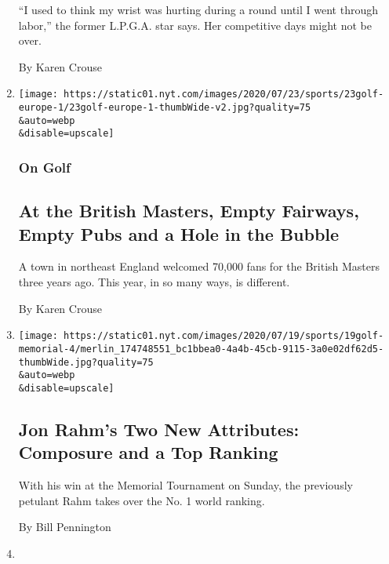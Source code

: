 \begin{enumerate}
  ``I used to think my wrist was hurting during a round until I went
  through labor,'' the former L.P.G.A. star says. Her competitive days
  might not be over.

  By Karen Crouse
\item
  \href{/2020/07/23/sports/golf/british-masters-newcastle-wylam.html}{}

  \texttt{[image: https://static01.nyt.com/images/2020/07/23/sports/23golf-europe-1/23golf-europe-1-thumbWide-v2.jpg?quality=75\\\&auto=webp\\\&disable=upscale]}

  \hypertarget{on-golf}{%
  \subsubsection{On Golf}\label{on-golf}}

  \hypertarget{at-the-british-masters-empty-fairways-empty-pubs-and-a-hole-in-the-bubble}{%
  \subsection{At the British Masters, Empty Fairways, Empty Pubs and a
  Hole in the
  Bubble}\label{at-the-british-masters-empty-fairways-empty-pubs-and-a-hole-in-the-bubble}}

  A town in northeast England welcomed 70,000 fans for the British
  Masters three years ago. This year, in so many ways, is different.

  By Karen Crouse
\item
  \href{/2020/07/19/sports/golf/jon-rahm-penalty-memorial-tournament-score.html}{}

  \texttt{[image: https://static01.nyt.com/images/2020/07/19/sports/19golf-memorial-4/merlin\_174748551\_bc1bbea0-4a4b-45cb-9115-3a0e02df62d5-thumbWide.jpg?quality=75\\\&auto=webp\\\&disable=upscale]}

  \hypertarget{jon-rahms-two-new-attributes-composure-and-a-top-ranking}{%
  \subsection{Jon Rahm's Two New Attributes: Composure and a Top
  Ranking}\label{jon-rahms-two-new-attributes-composure-and-a-top-ranking}}

  With his win at the Memorial Tournament on Sunday, the previously
  petulant Rahm takes over the No. 1 world ranking.

  By Bill Pennington
\item
  \href{/2020/07/17/sports/golf/tiger-woods-memorial-tournament-score.html}{}


\end{enumerate}
